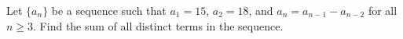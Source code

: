 Let $\{a_n\}$ be a sequence such that $a_1=15$, $a_2=18$, and $a_n=a_{n-1}-a_{n-2}$ for all $n\geq 3$. Find the sum of all distinct terms in the sequence.
